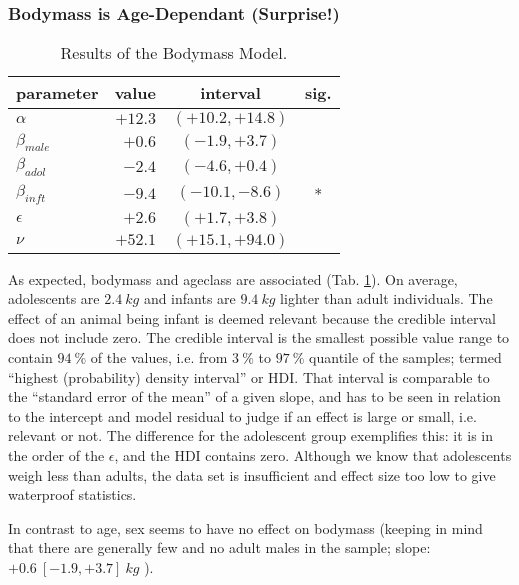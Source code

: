 \subsubsection{Bodymass is Age-Dependant (Surprise!)}
\label{bodymass:results}
\begin{table}[htbp]
\caption{\label{tab:bodyproportions}Results of the Bodymass Model.}
\centering
\begin{tabular}{|l|r|c|c|}
\hline
\textbf{parameter} & \textbf{value} & \textbf{interval} & \textbf{sig.}\\[0pt]
\hline
\(\alpha\) & \(+12.3\) & \(\left(+10.2, +14.8\right)\) & \\[0pt]
\(\beta_{male}\) & \(+0.6\) & \(\left(-1.9, +3.7\right)\) & \\[0pt]
\(\beta_{adol}\) & \(-2.4\) & \(\left(-4.6, +0.4\right)\) & \\[0pt]
\(\beta_{inft}\) & \(-9.4\) & \(\left(-10.1, -8.6\right)\) & *\\[0pt]
\(\epsilon\) & \(+2.6\) & \(\left(+1.7, +3.8\right)\) & \\[0pt]
\(\nu\) & \(+52.1\) & \(\left(+15.1, +94.0\right)\) & \\[0pt]
\hline
\end{tabular}
\end{table}


As expected, bodymass and ageclass are associated (Tab. \ref{tab:bodyproportions}).
On average, adolescents are \(2.4\ kg\) and infants are \(9.4\ kg\) lighter than adult individuals.
The effect of an animal being infant is deemed relevant because the credible interval does not include zero.
The credible interval is the smallest possible value range to contain \(94\ \%\) of the values, i.e. from \(3\ \%\) to \(97\ \%\) quantile of the samples; termed ``highest (probability) density interval'' or HDI.
That interval is comparable to the ``standard error of the mean'' of a given slope, and has to be seen in relation to the intercept and model residual to judge if an effect is large or small, i.e. relevant or not.
The difference for the adolescent group exemplifies this: it is in the order of the \(\epsilon\), and the HDI contains zero.
Although we know that adolescents weigh less than adults, the data set is insufficient and effect size too low to give waterproof statistics.

In contrast to age, sex seems to have no effect on bodymass (keeping in mind that there are generally few and no adult males in the sample; slope: \(+0.6\ [-1.9, +3.7]\ kg\) ).

